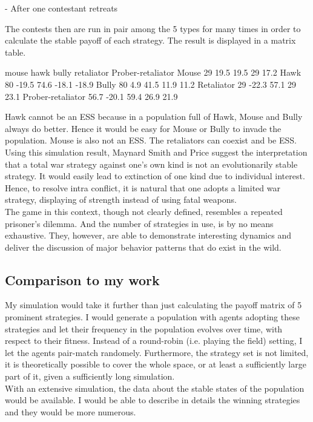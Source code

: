 \documentclass[12.5pt]{report}
\begin{document}
- After one contestant retreats

The contests then are run in pair among the 5 types for many times in order to calculate the stable payoff of each strategy. The result is displayed in a matrix table. 

mouse
hawk
bully
retaliator
Prober-retaliator
Mouse
29
19.5
19.5
29
17.2
Hawk
80
-19.5
74.6
-18.1
-18.9
Bully
80
4.9
41.5
11.9
11.2
Retaliator
29
-22.3
57.1
29
23.1
Prober-retaliator
56.7
-20.1
59.4
26.9
21.9

Hawk cannot be an ESS because in a population full of Hawk, Mouse and Bully always do better. Hence it would be easy for Mouse or Bully to invade the population. Mouse is also not an ESS. The retaliators can coexist and be ESS. \\

Using this simulation result, Maynard Smith and Price suggest the interpretation that a total war strategy against one’s own kind is not an evolutionarily stable strategy. It would easily lead to extinction of one kind due to individual interest. Hence, to resolve intra conflict, it is natural that one adopts a limited war strategy, displaying of strength instead of using fatal weapons.\\

The game in this context, though not clearly defined, resembles a repeated prisoner’s dilemma. And the number of strategies in use, is by no means exhaustive. They, however, are able to demonstrate interesting dynamics and deliver the discussion of major behavior patterns that do exist in the wild.\\

\subsection{Comparison to my work}
My simulation would take it further than just calculating the payoff matrix of 5 prominent strategies. I would generate a population with agents adopting these strategies and let their frequency in the population evolves over time, with respect to their fitness. Instead of a round-robin (i.e. playing the field) setting, I let the agents pair-match randomely. Furthermore, the strategy set is not limited, it is theoretically possible to cover the whole space, or at least a sufficiently large part of it, given a sufficiently long simulation.\\

With an extensive simulation, the data about the stable states of the population would be available. I would be able to describe in details the winning strategies and they would be more numerous.\\
\end{document}
